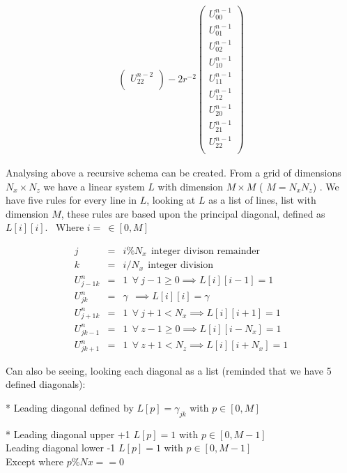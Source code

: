 \documentclass[legalpaper, 12pt]{article}
\begin{document}
\begin{eqnarray}
\begin{pmatrix}
U_{22}^{n-2} \\
\end{pmatrix}
-2r^{-2} 
\begin{pmatrix}
U_{00}^{n-1} \\
U_{01}^{n-1} \\ 
U_{02}^{n-1} \\ 
U_{10}^{n-1} \\ 
U_{11}^{n-1} \\ 
U_{12}^{n-1} \\ 
U_{20}^{n-1} \\ 
U_{21}^{n-1} \\ 
U_{22}^{n-1} \\
\end{pmatrix}
\end{eqnarray}



Analysing above a recursive schema can be created. From a grid of dimensions $ N_x \times N_z $ we have a linear system $L$ with dimension $ M \times M $ ( $ M = N_x N_z $) . We have five rules for every line in $ L $, looking at $ L $ as a list of lines, list with dimension $ M $, these rules are based upon the principal diagonal, defined as $L[i][i]$.
\newline
\ 
Where $ i = \ \in [0, M] $

\begin{eqnarray}
	j &=& i \% N_x \nonumber \ \  \mbox{integer divison remainder} \\ 
	k &=& i / N_x \nonumber \ \ \mbox{integer division} \\
	U_{j-1k}^n &=& 1 \ \ \forall \ j-1 \geq 0 \implies L[i][i-1] = 1 \nonumber \\
	U_{jk}^n &=&  \gamma \ \ \implies L[i][i] = \gamma \nonumber \\
	U_{j+1k}^n &=& 1 \ \ \forall \ j+1 < N_x \implies L[i][i+1] = 1 \nonumber \\
	U_{jk-1}^n &=& 1 \ \ \forall \ z-1 \geq 0 \implies L[i][i-N_x] = 1 \nonumber \\
	U_{jk+1}^n &=& 1 \ \ \forall \ z+1 < N_z \implies L[i][i+N_x] = 1 \nonumber 
\end{eqnarray}

Can also be seeing, looking each diagonal as a list (reminded that we have 5 defined diagonals): 

* Leading diagonal defined by $L[p] = \gamma_{jk}$ with $p \in [0, M] $

* Leading diagonal upper +1 $L[p] = 1$ with $p \in [0, M-1] $ \\
   Leading diagonal lower -1  $L[p] = 1$ with $p \in [0, M-1] $ \\
   Except where $ p \%Nx == 0 $
\end{document}

